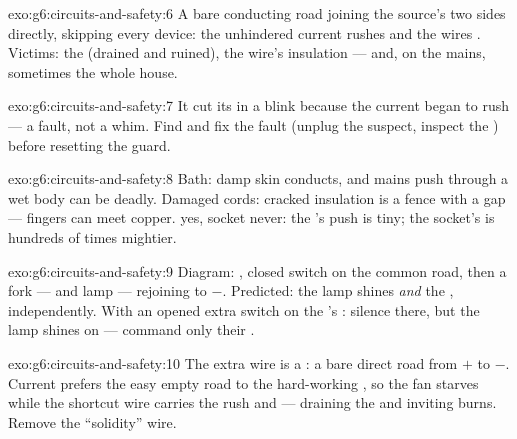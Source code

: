 \begin{solution}{exo:g6:circuits-and-safety:6}
A bare conducting road joining the source's two sides directly,
skipping every device: the unhindered current rushes and the wires
. Victims: the  (drained and ruined), the wire's
insulation --- and, on the mains, sometimes the whole house.
\end{solution}

\begin{solution}{exo:g6:circuits-and-safety:7}
It cut its  in a blink because the current began to rush ---
a fault, not a whim. Find and fix the fault (unplug the suspect,
inspect the ) before resetting the guard.
\end{solution}

\begin{solution}{exo:g6:circuits-and-safety:8}
Bath: damp skin conducts, and mains push through a wet body can be
deadly. Damaged cords: cracked insulation is a fence with a gap
--- fingers can meet copper.  yes, socket never: the
's push is tiny; the socket's is hundreds of times
mightier.
\end{solution}

\begin{solution}{exo:g6:circuits-and-safety:9}
Diagram: , closed switch on the common road, then a fork
---   and lamp  --- rejoining to $-$. Predicted:
the lamp shines \emph{and} the  , independently. With
an opened extra switch on the 's : silence there, but
the lamp shines on ---   command only their .
\end{solution}

\begin{solution}{exo:g6:circuits-and-safety:10}
The extra wire is a : a bare direct road from $+$ to
$-$. Current prefers the easy empty road to the hard-working
, so the fan starves while the shortcut wire carries the rush
and  --- draining the  and inviting burns. Remove the
``solidity'' wire.
\end{solution}

